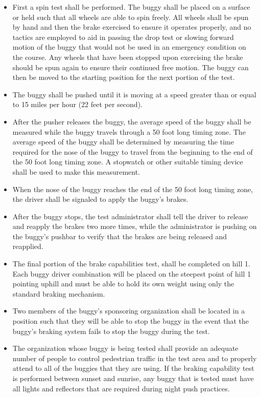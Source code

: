 	\begin{itemize}
	
		\item
		First a spin test shall be performed. The buggy shall be placed on a surface 
		or held such that all wheels are able to spin freely. All wheels shall be spun 
		by hand and then the brake exercised to ensure it operates properly, and no 
		tactics are employed to aid in passing the drop test or slowing forward motion 
		of the buggy that would not be used in an emergency condition on the course. 
		Any wheels that have been stopped upon exercising the brake should be spun 
		again to ensure their continued free motion. The buggy can then be moved to the 
		starting position for the next portion of the test.

		\item
		The buggy shall be pushed until it is moving at a speed greater than or equal
		to 15 miles per hour (22 feet per second).

		\item
		After the pusher releases the buggy, the average speed of the buggy shall be
		measured while the buggy travels through a 50 foot long timing zone. The
		average speed of the buggy shall be determined by measuring the time required
		for the nose of the buggy to travel from the beginning to the end of the 50
		foot long timing zone. A stopwatch or other suitable timing device shall be
		used to make this measurement.

		\item
		When the nose of the buggy reaches the end of the 50 foot long timing zone, the
		driver shall be signaled to apply the buggy's brakes.

		\item
		After the buggy stops, the test administrator shall tell the driver to release
		and reapply the brakes two more times, while the administrator is pushing on
		the buggy's pushbar to verify that the brakes are being released and reapplied.

		\item
		The final portion of the brake capabilities test, shall be completed on hill 1.
		Each buggy driver combination will be placed on the steepest point of hill 1
		pointing uphill and must be able to hold its own weight using only the standard
		braking mechanism.

		\item
		Two members of the buggy's sponsoring organization shall be located in a
		position such that they will be able to stop the buggy in the event that the
		buggy's braking system fails to stop the buggy during the test.
		
		\item
		The organization whose buggy is being tested shall provide an adequate number
		of people to control pedestrian traffic in the test area and to properly attend
		to all of the buggies that they are using. If the braking capability test is
		performed between sunset and sunrise, any buggy that is tested must have all
		lights and reflectors that are required during night push practices.

	\end{itemize}

